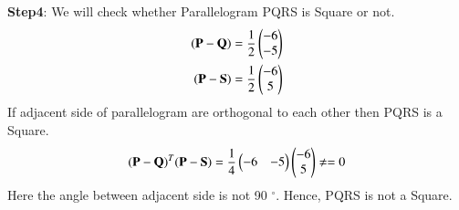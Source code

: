 \textbf{Step4}: We will check whether Parallelogram PQRS is Square or not.
\begin{align}
(\mathbf{P-Q})=\frac{1}{2}\begin{pmatrix}-6 \\-5\end{pmatrix} 
\\
(\mathbf{P-S})=\frac{1}{2}\begin{pmatrix}-6\\5\end{pmatrix} 
\\
\end{align}
If adjacent side of parallelogram are orthogonal to each other then PQRS is a Square.
\begin{align}
(\mathbf{P-Q})^T(\mathbf{P-S})=\frac{1}{4}\begin{pmatrix}-6 & -5\end{pmatrix}\begin{pmatrix}-6 \\ 5\end{pmatrix} \ne = 0 
\end{align}
Here the angle between adjacent side is not 90 $^{\circ}$.
Hence, PQRS is not a Square.
